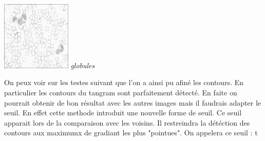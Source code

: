 \documentclass[a4,12pt]{article}
\begin{document}
\begin{minipage}[c]{0.20\linewidth}
	\begin{center}
		\includegraphics[width = 33mm]{./img/p2test_grad_fin_globules_t10.jpg}
		\textit{globules}
	\end{center}
\end{minipage}

On peux voir sur les testes suivant que l'on a ainsi pu afiné les contours.
En particulier les contours du tangram sont parfaitement détecté.
En faite on pourrait obtenir de bon résultat avec les autres images mais il faudrais adapter le seuil.
En effet cette methode introduit une nouvelle forme de seuil.
Ce seuil apparait lors de la comparaison avec les voisins. Il restreindra la détéction des contours aux maximumx de gradiant les plus "pointues".
On appelera ce seuil : t\\
\end{document}
